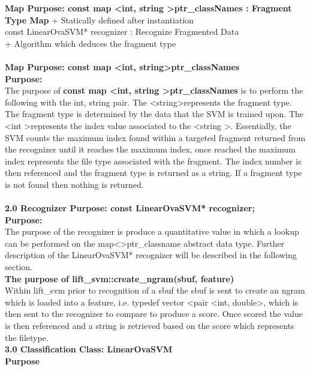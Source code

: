 \documentclass{report}
\begin{document}
\textbf{ Map Purpose: const map \textless int, string \textgreater ptr\_classNames : Fragment Type Map}
+ Statically defined after instantiation
\\
{\color{blue} const LinearOvaSVM* recognizer : Recognize Fragmented Data } \\
+ Algorithm which deduces the fragment type
\\
\\
\textbf{{\color{blue} Map Purpose: const map \textless int, string\textgreater* ptr\_classNames}}\\
\textbf{Purpose:}
\\
The purpose of \textbf{const map \textless int, string \textgreater ptr\_classNames} is to perform the following with the int, string pair.  The <string\textgreater represents the fragment type.  The fragment type is determined by the data that the SVM is trained upon.  The \textless int \textgreater represents the index value associated to the \textless string \textgreater .  Essentially, the SVM counts the maximum index found within a targeted fragment returned from the recognizer until it reaches the maximum index, once reached the maximum index represents the file type associated with the fragment.  The index number is then referenced and the fragment type is returned as a string.  If a fragment type is not found then nothing is returned.
\\
\\
\textbf{{\color{blue} 2.0 Recognizer Purpose: const LinearOvaSVM* recognizer;}}
\\
\textbf{Purpose:}
\\
The purpose of the recognizer is produce a quantitative value in which a lookup can be performed on the map\textless \textgreater ptr\_classname abstract data type.  Further description of the LinearOvaSVM* recognizer will be described in the following section.
\\
\textbf{The purpose of lift\_svm::create\_ngram(sbuf, feature)}
\\
Within lift\_svm prior to recognition of a sbuf the sbuf is sent to create an ngram which is loaded into a feature, i.e. typedef vector \textless pair \textless int, double\textgreater, which is then sent to the recognizer to compare to produce a score.  Once scored the value is then referenced and a string is retrieved based on the score which represents the filetype.
\\
\textbf{\color{blue}3.0 Classification Class: LinearOvaSVM }
\\
\textbf{Purpose}
\end{document}
